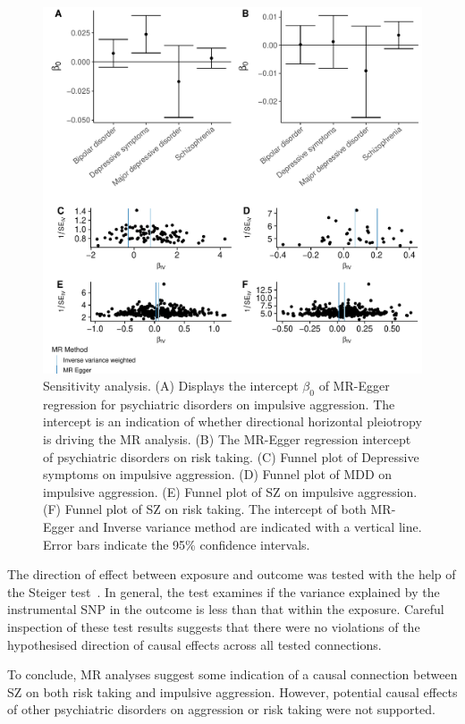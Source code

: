 \begin{figure}[htpb]
  \centering
  \includegraphics[width=0.9\linewidth]{ukb_psychiatric/figures/sensitvity_plot.pdf}
  \caption[Sensitivity analysis]{Sensitivity analysis.
    (A) Displays the intercept $\beta_0$ of MR-Egger regression for psychiatric disorders on impulsive aggression. The intercept is an indication of whether directional horizontal pleiotropy is driving the MR analysis.
    (B) The MR-Egger regression intercept of psychiatric disorders on risk taking.
    (C) Funnel plot of Depressive symptoms on impulsive aggression. 
    (D) Funnel plot of MDD on impulsive aggression. 
    (E) Funnel plot of SZ on impulsive aggression. 
    (F) Funnel plot of SZ on risk taking. 
    The intercept of both MR-Egger and Inverse variance method are indicated with a vertical line.
    Error bars indicate the 95\% confidence intervals.
  }\label{fig:sensitivity}
\end{figure}

The  direction of effect between exposure and outcome was tested with the help of the Steiger test~\cite{Steiger1980}.
In general, the test examines if the variance explained by the  instrumental SNP in the outcome is less than that within the exposure. 
Careful inspection of these test results suggests that there were no violations of the hypothesised direction of causal effects across all tested connections.

To conclude, MR analyses suggest some indication of a causal connection between SZ on both risk taking and impulsive aggression.
However, potential causal effects of other psychiatric disorders on aggression or risk taking were not supported.
